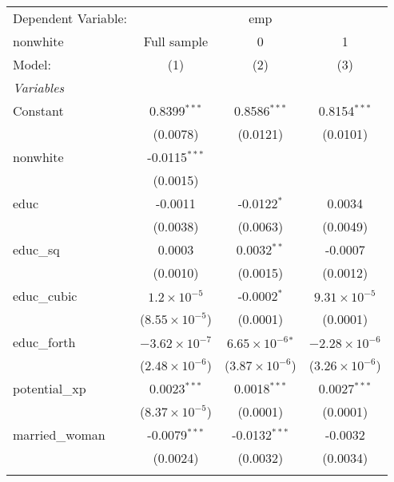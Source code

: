 
\begingroup
\centering
\begin{tabular}{lccc}
   \tabularnewline \midrule \midrule
   Dependent Variable: & \multicolumn{3}{c}{emp}\\
   nonwhite        & Full sample             & 0                           & 1 \\   
   Model:          & (1)                     & (2)                         & (3)\\  
   \midrule
   \emph{Variables}\\
   Constant        & 0.8399$^{***}$          & 0.8586$^{***}$              & 0.8154$^{***}$\\   
                   & (0.0078)                & (0.0121)                    & (0.0101)\\   
   nonwhite        & -0.0115$^{***}$         &                             &   \\   
                   & (0.0015)                &                             &   \\   
   educ            & -0.0011                 & -0.0122$^{*}$               & 0.0034\\   
                   & (0.0038)                & (0.0063)                    & (0.0049)\\   
   educ\_sq        & 0.0003                  & 0.0032$^{**}$               & -0.0007\\   
                   & (0.0010)                & (0.0015)                    & (0.0012)\\   
   educ\_cubic     & $1.2\times 10^{-5}$     & -0.0002$^{*}$               & $9.31\times 10^{-5}$\\    
                   & ($8.55\times 10^{-5}$)  & (0.0001)                    & (0.0001)\\   
   educ\_forth     & $-3.62\times 10^{-7}$   & $6.65\times 10^{-6}$$^{*}$  & $-2.28\times 10^{-6}$\\    
                   & ($2.48\times 10^{-6}$)  & ($3.87\times 10^{-6}$)      & ($3.26\times 10^{-6}$)\\    
   potential\_xp   & 0.0023$^{***}$          & 0.0018$^{***}$              & 0.0027$^{***}$\\   
                   & ($8.37\times 10^{-5}$)  & (0.0001)                    & (0.0001)\\   
   married\_woman  & -0.0079$^{***}$         & -0.0132$^{***}$             & -0.0032\\   
                   & (0.0024)                & (0.0032)                    & (0.0034)\\   
$$
\end{tabular}
